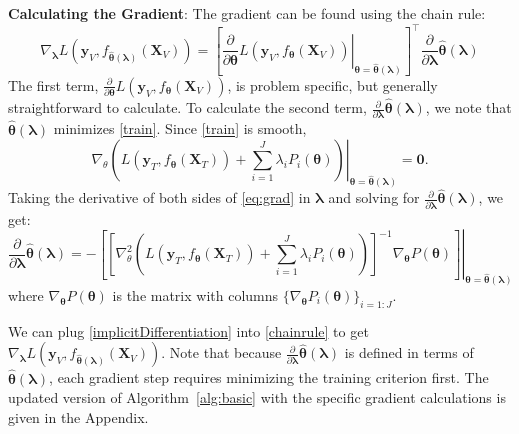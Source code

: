 \documentclass[12pt,letterpaper]{article}
\begin{document}
\noindent
\textbf{Calculating the Gradient}:
The gradient can be found using the chain rule:
\begin{equation}
\nabla_{\boldsymbol{\lambda}} L \left( \boldsymbol{y}_V, f_{\hat{\boldsymbol \theta}(\boldsymbol{\lambda})}(\boldsymbol{X}_V) \right ) = 
\left [
\left . \frac{\partial}{\partial \boldsymbol \theta} L ( \boldsymbol{y}_V, f_{\boldsymbol \theta}(\boldsymbol{X}_V)) \right |_{\boldsymbol \theta=\hat{\boldsymbol \theta}(\boldsymbol \lambda)}
\right ]^\top 
\frac{\partial}{\partial \boldsymbol{\lambda}} \hat{\boldsymbol \theta}(\boldsymbol{\lambda})
\label{chainrule}
\end{equation}
The first term, $\frac{\partial}{\partial \boldsymbol \theta} L ( \boldsymbol{y}_V, f_{\boldsymbol \theta}(\boldsymbol{X}_V))$, is problem specific, but generally straightforward to calculate. To calculate the second term, $\frac{\partial}{\partial \boldsymbol{\lambda}} \hat{\boldsymbol \theta}(\boldsymbol{\lambda})$, we note that $\hat{\boldsymbol \theta}(\boldsymbol{\lambda})$ minimizes \eqref{train}. Since \eqref{train} is smooth,
\begin{equation}
\nabla_\theta 
\left . \left (
L(\boldsymbol{y}_T, f_{\boldsymbol \theta} (\boldsymbol{X}_T)) +
\sum\limits_{i=1}^J \lambda_i P_i(\boldsymbol \theta)
\right ) \right |_{\boldsymbol \theta = \hat {\boldsymbol \theta}(\boldsymbol{\lambda})}
= \boldsymbol{0}.
\label{eq:grad}
\end{equation}
Taking the derivative of both sides of \eqref{eq:grad} in $\boldsymbol{\lambda}$ and solving for $\frac{\partial}{\partial \boldsymbol{\lambda}} \hat{\boldsymbol \theta}(\boldsymbol{\lambda})$, we get:
\begin{equation}
\frac{\partial}{\partial \boldsymbol{\lambda}} \hat{\boldsymbol \theta}(\boldsymbol{\lambda}) = 
- \left . \left [ \left [
 \nabla_\theta^2 \left (  L \left (\boldsymbol{y}_T, f_{\boldsymbol \theta} (\boldsymbol{X}_T) \right)  +  \sum\limits_{i=1}^J \lambda_i P_i(\boldsymbol \theta)  \right )  \right ]^{-1}
\nabla_{\boldsymbol \theta} P(\boldsymbol \theta)
\right ]
\right |_{\boldsymbol \theta = \hat {\boldsymbol \theta}(\boldsymbol{\lambda})}
\label{implicitDifferentiation}
\end{equation}
where $\nabla_{\boldsymbol \theta} P(\boldsymbol \theta)$ is the matrix with columns $\{\nabla_{\boldsymbol \theta} P_i(\boldsymbol \theta)\}_{i=1:J}$.

We can plug \eqref{implicitDifferentiation} into \eqref{chainrule} to get $\nabla_{\boldsymbol{\lambda}} L \left ( \boldsymbol{y}_V, f_{\hat{\boldsymbol \theta}(\boldsymbol{\lambda})}(\boldsymbol{X}_V) \right )$. Note that because $\frac{\partial}{\partial \boldsymbol{\lambda}} \hat{\boldsymbol \theta}(\boldsymbol{\lambda})$ is defined in terms of $\hat{\boldsymbol \theta}\left(\boldsymbol{\lambda}\right)$, each gradient step requires minimizing the training criterion first. The updated version of Algorithm~\ref{alg:basic} with the specific gradient calculations is given in the Appendix.
\end{document}
